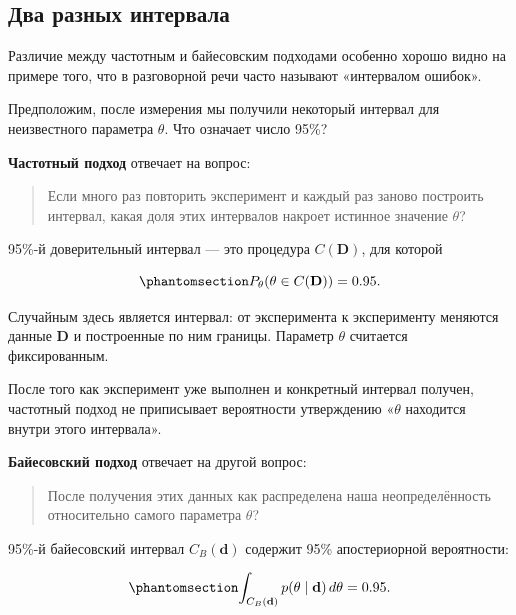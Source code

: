 \documentclass[
  russian,
  11pt,
  a4paper,
  open=any]{scrbook}
\begin{document}
\subsection{Два разных
интервала}\label{ux434ux432ux430-ux440ux430ux437ux43dux44bux445-ux438ux43dux442ux435ux440ux432ux430ux43bux430}

Различие между частотным и байесовским подходами особенно хорошо видно
на примере того, что в разговорной речи часто называют «интервалом
ошибок».

Предположим, после измерения мы получили некоторый интервал для
неизвестного параметра \(\theta\). Что означает число 95\%?

\textbf{Частотный подход} отвечает на вопрос:

\begin{quote}
Если много раз повторить эксперимент и каждый раз заново построить
интервал, какая доля этих интервалов накроет истинное значение
\(\theta\)?
\end{quote}

95\%-й доверительный интервал --- это процедура \(C(\mathbf D)\), для
которой

\begin{equation}\protect\phantomsection\label{eq-frequentist-coverage}{
P_\theta\!\left(\theta\in C(\mathbf D)\right)=0.95.
}\end{equation}

Случайным здесь является интервал: от эксперимента к эксперименту
меняются данные \(\mathbf D\) и построенные по ним границы. Параметр
\(\theta\) считается фиксированным.

После того как эксперимент уже выполнен и конкретный интервал получен,
частотный подход не приписывает вероятности утверждению «\(\theta\)
находится внутри этого интервала».

\textbf{Байесовский подход} отвечает на другой вопрос:

\begin{quote}
После получения этих данных как распределена наша неопределённость
относительно самого параметра \(\theta\)?
\end{quote}

95\%-й байесовский интервал \(C_B(\mathbf d)\) содержит 95\%
апостериорной вероятности:

\begin{equation}\protect\phantomsection\label{eq-bayesian-credible-interval}{
\int_{C_B(\mathbf d)}
p(\theta\mid\mathbf d)\,d\theta
=0.95.
}\end{equation}
\end{document}
